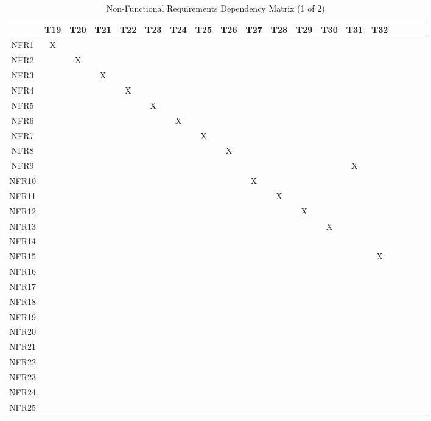 \documentclass[12pt, titlepage]{article}
\begin{document}
  \begin{table}[H]
  \centering
  \caption{Non-Functional Requirements Dependency Matrix (1 of 2)}
  \begin{tabular}{|c|c|c|c|c|c|c|c|c|c|c|c|c|c|c|c|c|c|c|}
  \hline
    & T19 & T20 & T21 & T22 & T23 & T24 & T25 & T26 & T27 & T28 & T29 & T30 & T31 & T32\\
  \hline
  NFR1      &X & & & & & & & & & & & & & \\ 
  \hline
  NFR2      & &X & & & & & & & & & & & & \\ 
  \hline
  NFR3      & & &X & & & & & & & & & & & \\ 
  \hline
  NFR4      & & & &X & & & & & & & & & & \\ 
  \hline
  NFR5      & & & & &X & & & & & & & & & \\ 
  \hline
  NFR6      & & & & & &X & & & & & & & & \\ 
  \hline
  NFR7      & & & & & & &X & & & & & & & \\ 
  \hline
  NFR8      & & & & & & & &X & & & & & & \\ 
  \hline
  NFR9      & & & & & & & & & & & & &X & \\ 
  \hline
  NFR10      & & & & & & & & &X & & & & & \\ 
  \hline
  NFR11      & & & & & & & & & &X & & & & \\ 
  \hline
  NFR12      & & & & & & & & & & &X & & & \\ 
  \hline
  NFR13      & & & & & & & & & & & &X & & \\ 
  \hline
  NFR14      & & & & & & & & & & & & & & \\ 
  \hline
  NFR15      & & & & & & & & & & & & & &X \\ 
  \hline
  NFR16      & & & & & & & & & & & & & & \\ 
  \hline
  NFR17      & & & & & & & & & & & & & & \\ 
  \hline
  NFR18      & & & & & & & & & & & & & & \\ 
  \hline
  NFR19      & & & & & & & & & & & & & & \\ 
  \hline
  NFR20      & & & & & & & & & & & & & & \\ 
  \hline
  NFR21      & & & & & & & & & & & & & & \\ 
  \hline
  NFR22      & & & & & & & & & & & & & & \\ 
  \hline
  NFR23      & & & & & & & & & & & & & & \\ 
  \hline
  NFR24      & & & & & & & & & & & & & & \\ 
  \hline
  NFR25      & & & & & & & & & & & & & & \\ 
  \hline
  \end{tabular}
  \label{Table:B_trace}

\end{table}
  
\end{document}
